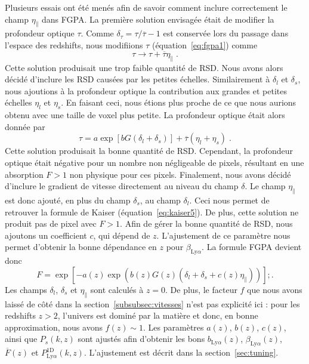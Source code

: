 Plusieurs essais ont été menés afin de savoir comment inclure correctement le champ $\eta_{\parallel}$ dans FGPA.
La première solution envisagée était de modifier la profondeur optique $\tau$. Comme $\delta_{\tau} = \tau / \overline \tau - 1$ est conservée lors du passage dans l'espace des redshifts, nous modifiions $\tau$ (équation~\ref{eq:fgpa1}) comme
\begin{equation}
  \tau \rightarrow \tau + \overline \tau \eta_{\parallel} \; .
\end{equation}
Cette solution produisait une trop faible quantité de RSD. Nous avons alors décidé d'inclure les RSD causées par les petites échelles. Similairement à $\delta_l$ et $\delta_s$, nous ajoutions à la profondeur optique la contribution aux grandes et petites échelles $\eta_l$ et $\eta_s$. En faisant ceci, nous étions plus proche de ce que nous aurions obtenu avec une taille de voxel plus petite.
La profondeur optique était alors donnée par
\begin{equation}
  \tau = a \exp\left[b G (\delta_l + \delta_s)\right] + \overline \tau (\eta_l + \eta_s) \; .
\end{equation}
Cette solution produisait la bonne quantité de RSD. Cependant, la profondeur optique était négative pour un nombre non négligeable de pixels, résultant en une absorption $F > 1$ non physique pour ces pixels.
Finalement, nous avons décidé d'inclure le gradient de vitesse directement au niveau du champ $\delta$.
Le champ $\eta_{\parallel}$ est donc ajouté, en plus du champ $\delta_s$, au champ $\delta_l$. Ceci nous permet de retrouver la formule de Kaiser (équation~\ref{eq:kaiser5}). De plus, cette solution ne produit pas de pixel avec $F > 1$.
Afin de gérer la bonne quantité de RSD, nous ajoutons un coefficient $c$, qui dépend de $z$. L'ajustement de ce paramètre nous permet d'obtenir la bonne dépendance en $z$ pour $\beta_{\mathrm{Ly}\alpha}$. La formule FGPA devient donc
\begin{equation}
  \label{eq:fgpa4}
  F = \exp\left[ - a(z) \exp(b(z) G(z) (\delta_l + \delta_s + c(z)\eta_{\parallel}))\right] ;.  
\end{equation}
Les champs $\delta_l$, $\delta_s$ et $\eta_{\parallel}$ sont calculés à $z=0$. De plus, le facteur $f$ que nous avons laissé de côté dans la section~\ref{subsubsec:vitesses} n'est pas explicité ici : pour les redshifts $z > 2$, l'univers est dominé par la matière et donc, en bonne approximation, nous avons $f(z) \sim 1$. Les paramètres $a(z)$, $b(z)$, $c(z)$, ainsi que $P_{s}(k,z)$ sont ajustés afin d'obtenir les bons $b_{\mathrm{Ly}\alpha}(z)$, $\beta_{\mathrm{Ly}\alpha}(z)$, $\overline F(z)$ et $P^{\mathrm{1D}}_{\mathrm{Ly}\alpha}(k,z)$. L'ajustement est décrit dans la section~\ref{sec:tuning}.


